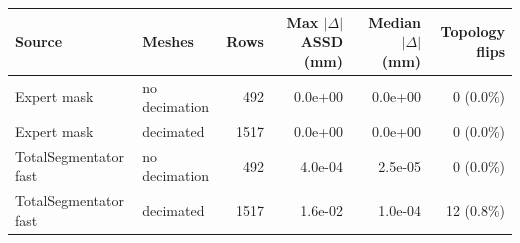 \begin{tabular}{llrrrr}
\toprule
Source & Meshes & Rows & Max $|\Delta|$ ASSD (mm) & Median $|\Delta|$ (mm) & Topology flips \\
\midrule
Expert mask & no decimation & 492 & 0.0e+00 & 0.0e+00 & 0 (0.0\%) \\
Expert mask & decimated & 1517 & 0.0e+00 & 0.0e+00 & 0 (0.0\%) \\
TotalSegmentator fast & no decimation & 492 & 4.0e-04 & 2.5e-05 & 0 (0.0\%) \\
TotalSegmentator fast & decimated & 1517 & 1.6e-02 & 1.0e-04 & 12 (0.8\%) \\
\bottomrule
\end{tabular}
